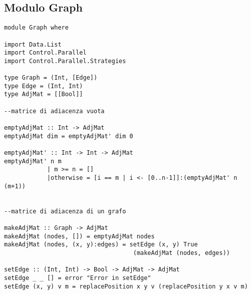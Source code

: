 \subsection{Modulo Graph}
\begin{verbatim}
module Graph where

import Data.List
import Control.Parallel
import Control.Parallel.Strategies

type Graph = (Int, [Edge])
type Edge = (Int, Int)
type AdjMat = [[Bool]]

--matrice di adiacenza vuota

emptyAdjMat :: Int -> AdjMat
emptyAdjMat dim = emptyAdjMat' dim 0

emptyAdjMat' :: Int -> Int -> AdjMat
emptyAdjMat' n m
            | m >= n = []
            |otherwise = [i == m | i <- [0..n-1]]:(emptyAdjMat' n (m+1))

            
--matrice di adiacenza di un grafo            

makeAdjMat :: Graph -> AdjMat
makeAdjMat (nodes, []) = emptyAdjMat nodes
makeAdjMat (nodes, (x, y):edges) = setEdge (x, y) True
                                    (makeAdjMat (nodes, edges))

setEdge :: (Int, Int) -> Bool -> AdjMat -> AdjMat
setEdge _ _ [] = error "Error in setEdge"
setEdge (x, y) v m = replacePosition x y v (replacePosition y x v m)
\end{verbatim}
\newpage
